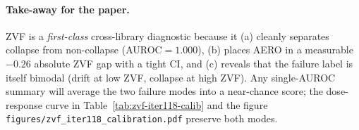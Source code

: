 \paragraph{Take-away for the paper.}
ZVF is a \emph{first-class} cross-library diagnostic because it
(a) cleanly separates collapse from non-collapse
(AUROC$=1.000$), (b) places AERO in a measurable $-0.26$ absolute
ZVF gap with a tight CI, and (c) reveals that the failure label
is itself bimodal (drift at low ZVF, collapse at high ZVF). Any
single-AUROC summary will average the two failure modes into a
near-chance score; the dose-response curve in
Table~\ref{tab:zvf-iter118-calib} and the figure
\texttt{figures/zvf\_iter118\_calibration.pdf} preserve both modes.
